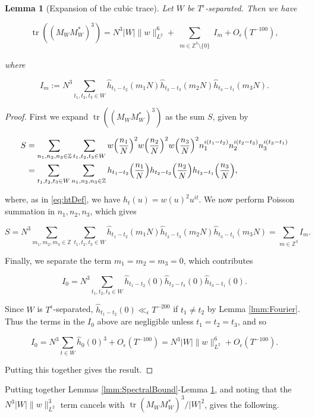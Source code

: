\documentclass{amsart}
\theoremstyle{plain}
\newtheorem{lmm}[thrm]{Lemma}
\numberwithin{equation}{section}
\DeclareMathOperator*{\tr}{tr}
\begin{document}
\begin{lmm}[Expansion of the cubic trace]\label{lmm:TraceExpansion}
Let $W$ be $T^\epsilon$-separated. Then we have

\[
\tr((M_W M_W^*)^3) =N^3|W|\|w\|_{L^2}^6+  \sum_{\substack{m\in \mathbb{Z}^3\setminus\{ 0\} }}I_m+ O_\epsilon(T^{-100}),
\]

where

\[
I_m := N^3 \sum_{t_1,t_2,t_3\in W}\widehat{h}_{t_1-t_2}(m_1N)\widehat{h}_{t_2-t_3}(m_2N)\widehat{h}_{t_3-t_1}(m_3N). 
\]
\end{lmm}
\begin{proof}
First we expand $\tr((M_W M_W^*)^3)$ as the sum $S$, given by

\begin{align*}
S& = \sum_{n_1,n_2,n_3\in \mathbb{Z}}\sum_{t_1,t_2,t_3\in W}w\Bigl(\frac{n_1}{N}\Bigr)^2 w\Bigl(\frac{n_2}{N}\Bigr)^2 w\Bigl(\frac{n_3}{N}\Bigr)^2 n_1^{i(t_1-t_2)}n_2^{i(t_2-t_3)}n_3^{i(t_3-t_1)}\\
&=\sum_{t_1,t_2,t_3\in W} \sum_{n_1,n_2,n_3\in \mathbb{Z}} h_{t_1-t_2}\Bigl(\frac{n_1}{N}\Bigr)h_{t_2-t_3}\Bigl(\frac{n_2}{N}\Bigr)h_{t_3-t_1}\Bigl(\frac{n_3}{N}\Bigr),
\end{align*}

where, as in \eqref{eq:htDef}, we have $ h_t(u)= w(u)^2 u^{it}$. We now perform Poisson summation in $n_1, n_2, n_3$, which gives

\[
S=N^3\sum_{m_1,m_2,m_3\in \mathbb{Z}}\sum_{t_1,t_2,t_3\in W}\widehat{h}_{t_1-t_2}(m_1N)\widehat{h}_{t_2-t_3}(m_2N)\widehat{h}_{t_3-t_1}(m_3N)=\sum_{m\in\mathbb{Z}^3}I_m. 
\]

Finally, we separate the term $m_1=m_2=m_3=0$, which contributes

\[
I_0=N^3\sum_{t_1,t_2,t_3\in W}\widehat{h}_{t_1-t_2}(0)\widehat{h}_{t_2-t_3}(0)\widehat{h}_{t_3-t_1}(0).
\]

Since $W$ is $T^\epsilon$-separated, $\widehat{h}_{t_1-t_2}(0)\ll_\epsilon T^{-200}$ if $t_1\ne t_2$ by Lemma \ref{lmm:Fourier}. Thus the terms in the $I_0$ above are negligible unless $t_1=t_2=t_3$, and so

\[
I_0=N^3\sum_{t\in W}\widehat{h}_0(0)^3+O_\epsilon(T^{-100})=N^3|W|\|w\|_{L^2}^6+O_\epsilon(T^{-100}).
\]

Putting this together gives the result.
\end{proof}

Putting together Lemmas \ref{lmm:SpectralBound}-Lemma \ref{lmm:TraceExpansion}, and noting that the $N^3 |W| \|w\|_{L^2}^3$ term cancels with $\tr(M_W M_W^*)^3/|W|^2$, gives the following.
\end{document}
